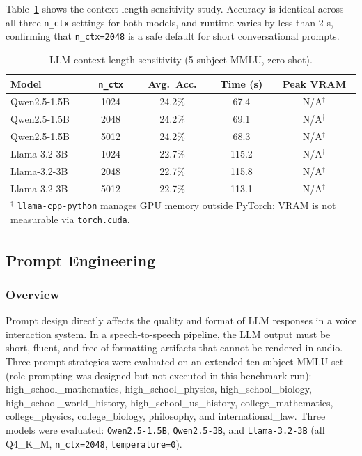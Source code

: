 \documentclass[12pt, a4paper]{article}
\begin{document}
Table~\ref{tab:llm_ctx_results} shows the context-length sensitivity study. Accuracy is identical across all three \texttt{n\_ctx} settings for both models, and runtime varies by less than 2 s, confirming that \texttt{n\_ctx=2048} is a safe default for short conversational prompts.

\begin{table}[H]
\centering
\caption{LLM context-length sensitivity (5-subject MMLU, zero-shot).}
\label{tab:llm_ctx_results}
\begin{tabular}{lcccc}
\toprule
Model & \texttt{n\_ctx} & Avg.\ Acc. & Time (s) & Peak VRAM \\
\midrule
Qwen2.5-1.5B & 1024 & 24.2\% & \phantom{0}67.4 & N/A$^\dagger$ \\
Qwen2.5-1.5B & 2048 & 24.2\% & \phantom{0}69.1 & N/A$^\dagger$ \\
Qwen2.5-1.5B & 5012 & 24.2\% & \phantom{0}68.3 & N/A$^\dagger$ \\
Llama-3.2-3B & 1024 & 22.7\% & 115.2           & N/A$^\dagger$ \\
Llama-3.2-3B & 2048 & 22.7\% & 115.8           & N/A$^\dagger$ \\
Llama-3.2-3B & 5012 & 22.7\% & 113.1           & N/A$^\dagger$ \\
\bottomrule
\multicolumn{5}{l}{$^\dagger$ \texttt{llama-cpp-python} manages GPU memory outside PyTorch; VRAM is not measurable via \texttt{torch.cuda}.} \\
\end{tabular}
\end{table}

\subsection{Prompt Engineering}

\subsubsection{Overview}

Prompt design directly affects the quality and format of LLM responses in a voice interaction system. In a speech-to-speech pipeline, the LLM output must be short, fluent, and free of formatting artifacts that cannot be rendered in audio. Three prompt strategies were evaluated on an extended ten-subject MMLU set (role prompting was designed but not executed in this benchmark run): high\_school\_mathematics, high\_school\_physics, high\_school\_biology, high\_school\_world\_history, high\_school\_us\_history, college\_mathematics, college\_physics, college\_biology, philosophy, and international\_law. Three models were evaluated: \texttt{Qwen2.5-1.5B}, \texttt{Qwen2.5-3B}, and \texttt{Llama-3.2-3B} (all Q4\_K\_M, \texttt{n\_ctx=2048}, \texttt{temperature=0}).
\end{document}
